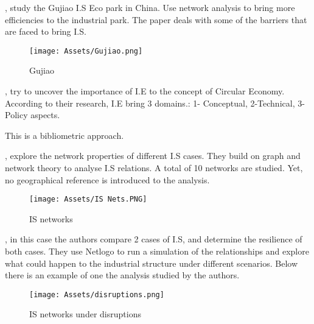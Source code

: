 \textbf{}\par
\textcite{Song2018}, study the Gujiao I.S Eco park in China. Use network analysis to bring more efficiencies to the industrial park. The paper deals with some of the barriers that are faced to bring I.S. \par


\begin{figure}[h!]
    \centering
    \texttt{[image: Assets/Gujiao.png]}
    \caption{Gujiao}
    \label{fig:Gujiao}
\end{figure}


\textbf{}\par
\textcite{Saavedra2018}, try to uncover the importance of I.E to the concept of Circular Economy. According to their research, I.E bring 3 domains.: 1- Conceptual, 2-Technical, 3- Policy aspects.\par 

This is a bibliometric approach.

\textbf{}\par
\textcite{Zhang2013}, explore the network properties of different I.S cases. They build on graph and network theory to analyse I.S relations. A total of 10 networks are studied. Yet, no geographical reference is introduced to the analysis. 


\begin{figure}[h!]
    \centering
    \texttt{[image: Assets/IS Nets.PNG]}
    \caption{IS networks}
    \label{fig:IS networks}
\end{figure}




\textbf{}\par
\textcite{Zhu2013}, in this case the authors compare 2 cases of I.S, and determine the resilience of both cases. They use Netlogo to run a simulation of the relationships and explore what could happen to the industrial structure under different scenarios. Below there is an example  of one the analysis studied by the authors. \par



\begin{figure}[h!]
    \centering
    \texttt{[image: Assets/disruptions.png]}
    \caption{IS networks under disruptions}
    \label{fig:IS networks disrupted}
\end{figure}


